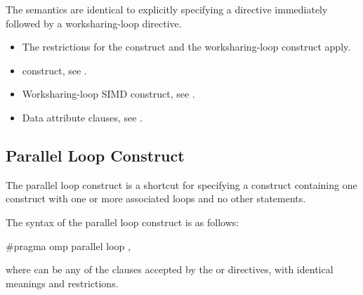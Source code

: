 \descr
The semantics are identical to explicitly specifying a  directive immediately
followed by a worksharing-loop directive.

\restrictions
\begin{itemize}
\item The restrictions for the  construct and the
    worksharing-loop construct apply.
\end{itemize}

\crossreferences
\begin{itemize}
\item {} construct, see
.

\item Worksharing-loop SIMD construct, see
.

\item Data attribute clauses, see
.
\end{itemize}




\subsection{Parallel Loop Construct}
\label{subsec:Parallel Loop Construct}
\summary
The parallel loop construct is a shortcut for specifying a  construct
containing one  construct with one or more associated loops and no other statements.



\syntax
\begin{ccppspecific}
The syntax of the parallel loop construct is as follows:

\begin{ompcPragma}
#pragma omp parallel loop \plc{[clause[ [},\plc{] clause] ... ] new-line}
\end{ompcPragma}

where  can be any of the clauses accepted by the  or
   directives, with identical meanings and restrictions.
\end{ccppspecific}

